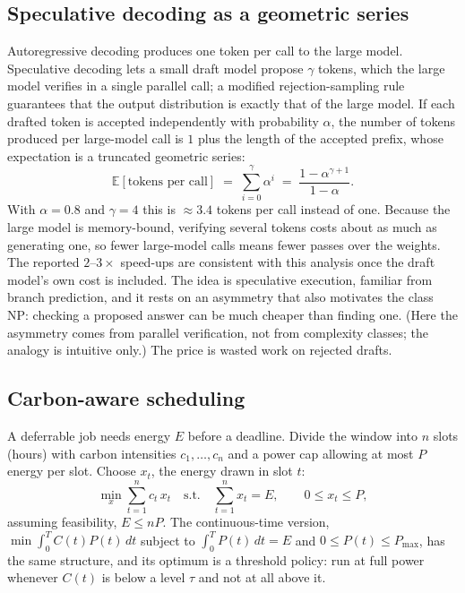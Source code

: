 \documentclass[11pt]{article}
\theoremstyle{definition}
\theoremstyle{remark}
\begin{document}
\subsection{Speculative decoding as a geometric series}\label{sec:spec}
Autoregressive decoding produces one token per call to the large model. Speculative decoding \citep{leviathan2023} lets a small draft model propose $\gamma$ tokens, which the large model verifies in a single parallel call; a modified rejection-sampling rule guarantees that the output distribution is exactly that of the large model. If each drafted token is accepted independently with probability $\alpha$, the number of tokens produced per large-model call is $1$ plus the length of the accepted prefix, whose expectation is a truncated geometric series:
\begin{equation}
  \mathbb{E}[\text{tokens per call}] \;=\; \sum_{i=0}^{\gamma} \alpha^{i} \;=\; \frac{1-\alpha^{\gamma+1}}{1-\alpha}.
\end{equation}
With $\alpha=0.8$ and $\gamma=4$ this is $\approx 3.4$ tokens per call instead of one. Because the large model is memory-bound, verifying several tokens costs about as much as generating one, so fewer large-model calls means fewer passes over the weights. The reported $2$--$3\times$ speed-ups are consistent with this analysis once the draft model's own cost is included. The idea is speculative execution, familiar from branch prediction, and it rests on an asymmetry that also motivates the class NP: checking a proposed answer can be much cheaper than finding one. (Here the asymmetry comes from parallel verification, not from complexity classes; the analogy is intuitive only.) The price is wasted work on rejected drafts.

\subsection{Carbon-aware scheduling}\label{sec:sched}
A deferrable job needs energy $E$ before a deadline. Divide the window into $n$ slots (hours) with carbon intensities $c_1,\dots,c_n$ and a power cap allowing at most $P$ energy per slot. Choose $x_t$, the energy drawn in slot $t$:
\begin{equation}
  \min_{x} \sum_{t=1}^{n} c_t\,x_t
  \quad\text{s.t.}\quad \sum_{t=1}^{n} x_t = E,\qquad 0 \le x_t \le P,
  \label{eq:sched}
\end{equation}
assuming feasibility, $E \le nP$. The continuous-time version, $\min \int_0^T C(t)P(t)\,dt$ subject to $\int_0^T P(t)\,dt = E$ and $0\le P(t)\le P_{\max}$, has the same structure, and its optimum is a threshold policy: run at full power whenever $C(t)$ is below a level $\tau$ and not at all above it.
\end{document}
